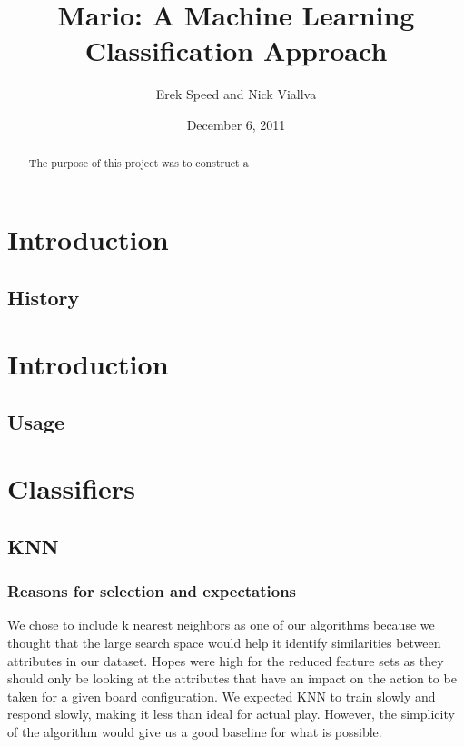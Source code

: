 \documentclass[]{report}   %
\begin{document}
\title{Mario: A Machine Learning Classification Approach}   %
\author{Erek Speed and Nick Viallva}         %
\date{December 6, 2011}    %
\maketitle

\begin{abstract}
 The purpose of this project was to construct a 
\end{abstract}


\section{Introduction}     %
\subsection{History}       %

\section{Introduction}     %
\subsection{Usage}         %

\section{Classifiers}
\subsection{KNN}
\subsubsection{Reasons for selection and expectations}
We chose to include k nearest neighbors as one of our algorithms because we thought that the large search space would help it identify similarities between attributes in our dataset. Hopes were high for the reduced feature sets as they should only be looking at the attributes that have an impact on the action to be taken for a given board configuration.  We expected KNN to train slowly and respond slowly, making it less than ideal for actual play. However, the simplicity of the algorithm would give us a good baseline for what is possible.
\end{document}
